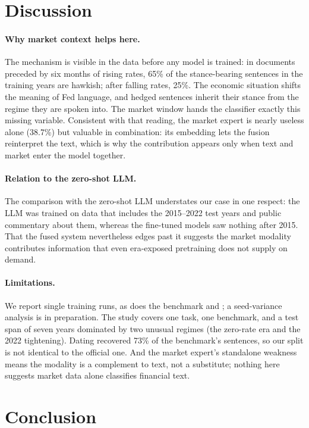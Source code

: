 \documentclass[11pt]{article}
\begin{document}
\section{Discussion}
\label{sec:discussion}

\paragraph{Why market context helps here.}
The mechanism is visible in the data before any model is trained: in documents preceded by six months of rising rates, 65\% of the stance-bearing sentences in the training years are hawkish; after falling rates, 25\%. The economic situation shifts the meaning of Fed language, and hedged sentences inherit their stance from the regime they are spoken into. The market window hands the classifier exactly this missing variable. Consistent with that reading, the market expert is nearly useless alone (38.7\%) but valuable in combination: its embedding lets the fusion reinterpret the text, which is why the contribution appears only when text and market enter the model together.

\paragraph{Relation to the zero-shot LLM.}
The comparison with the zero-shot LLM understates our case in one respect: the LLM was trained on data that includes the 2015--2022 test years and public commentary about them, whereas the fine-tuned models saw nothing after 2015. That the fused system nevertheless edges past it suggests the market modality contributes information that even era-exposed pretraining does not supply on demand.

\paragraph{Limitations.}
We report single training runs, as does the benchmark and \citet{schlee2025labelfusion}; a seed-variance analysis is in preparation. The study covers one task, one benchmark, and a test span of seven years dominated by two unusual regimes (the zero-rate era and the 2022 tightening). Dating recovered 73\% of the benchmark's sentences, so our split is not identical to the official one. And the market expert's standalone weakness means the modality is a complement to text, not a substitute; nothing here suggests market data alone classifies financial text.


\section{Conclusion}
\end{document}
